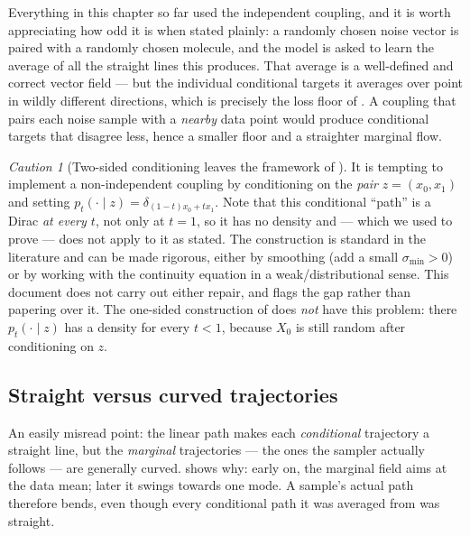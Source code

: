 \documentclass[11pt,a4paper]{report}
\theoremstyle{definition}
\theoremstyle{remark}
\newtheorem{caution}[caution]{Caution}
\begin{document}
Everything in this chapter so far used the independent coupling, and it is
worth appreciating how odd it is when stated plainly: a randomly chosen
noise vector is paired with a randomly chosen molecule, and the model is
asked to learn the average of all the straight lines this produces. That
average is a well-defined and correct vector field --- but the individual
conditional targets it averages over point in wildly different directions,
which is precisely the loss floor of . A coupling
that pairs each noise sample with a \emph{nearby} data point would produce
conditional targets that disagree less, hence a smaller floor and a
straighter marginal flow.

\begin{caution}[Two-sided conditioning leaves the framework of ]
\label{caution:two-sided-conditioning}
It is tempting to implement a non-independent coupling by conditioning on
the \emph{pair} $z=(x_0,x_1)$ and setting
$p_t(\cdot\mid z)=\delta_{(1-t)x_0+tx_1}$. Note that this conditional
``path'' is a Dirac \emph{at every $t$}, not only at $t=1$, so it has no
density and  --- which we used to prove
 --- does not apply to it as stated.
The construction is standard in the literature and can be made rigorous,
either by smoothing (add a small $\sigma_{\min}>0$) or by working with the
continuity equation in a weak/distributional sense. This document does not
carry out either repair, and flags the gap rather than papering over it.
The one-sided construction of  does
\emph{not} have this problem: there $p_t(\cdot\mid z)$ has a density for
every $t<1$, because $X_0$ is still random after conditioning on $z$.
\end{caution}

\subsection{Straight versus curved trajectories}

An easily misread point: the linear path makes each \emph{conditional}
trajectory a straight line, but the \emph{marginal} trajectories --- the
ones the sampler actually follows --- are generally curved.
 shows why: early on, the marginal field aims at the
data mean; later it swings towards one mode. A sample's actual path
therefore bends, even though every conditional path it was averaged from
was straight.
\end{document}
